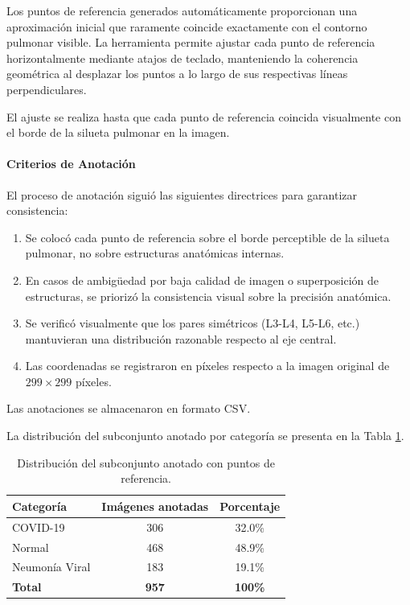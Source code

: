 Los puntos de referencia generados automáticamente proporcionan una aproximación inicial que raramente coincide exactamente con el contorno pulmonar visible. La herramienta permite ajustar cada punto de referencia horizontalmente mediante atajos de teclado, manteniendo la coherencia geométrica al desplazar los puntos a lo largo de sus respectivas líneas perpendiculares.

El ajuste se realiza hasta que cada punto de referencia coincida visualmente con el borde de la silueta pulmonar en la imagen.

\paragraph{Criterios de Anotación}

El proceso de anotación siguió las siguientes directrices para garantizar consistencia:

\begin{enumerate}
    \item Se colocó cada punto de referencia sobre el borde perceptible de la silueta pulmonar, no sobre estructuras anatómicas internas.
    \item En casos de ambigüedad por baja calidad de imagen o superposición de estructuras, se priorizó la consistencia visual sobre la precisión anatómica.
    \item Se verificó visualmente que los pares simétricos (L3-L4, L5-L6, etc.) mantuvieran una distribución razonable respecto al eje central.
    \item Las coordenadas se registraron en píxeles respecto a la imagen original de $299 \times 299$ píxeles.
\end{enumerate}

Las anotaciones se almacenaron en formato CSV.

La distribución del subconjunto anotado por categoría se presenta en la Tabla \ref{tab:distribucion_anotado}.

\begin{table}[htbp]
    \centering
    \caption{Distribución del subconjunto anotado con puntos de referencia.}
    \label{tab:distribucion_anotado}
    \small
    \begin{tabular}{@{}lcc@{}}
        \toprule
        \textbf{Categoría} & \textbf{Imágenes anotadas} & \textbf{Porcentaje} \\
        \midrule
        COVID-19 & 306 & 32.0\% \\
        Normal & 468 & 48.9\% \\
        Neumonía Viral & 183 & 19.1\% \\
        \midrule
        \textbf{Total} & \textbf{957} & \textbf{100\%} \\
        \bottomrule
    \end{tabular}
\end{table}


